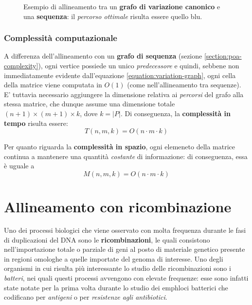 \begin{figure}[ht]
        \caption{Esempio di allineamento tra un \textbf{grafo di variazione canonico} e una \textbf{sequenza}: il \emph{percorso ottimale} risulta essere quello blu.}
    \end{figure}
\subsubsection{Complessità computazionale}
\label{section:variation-complexity}
   A differenza dell'allineamento con un \textbf{grafo di sequenza} (sezione \ref{section:poa-complexity}), ogni vertice possiede un unico \emph{predecessore} e quindi, sebbene non immediatamente evidente dall'equazione \ref{equation:variation-graph}, ogni cella della matrice viene computata in $O(1)$ (come nell'allineamento tra sequenze). E' tuttavia necessario aggiungere la dimensione relativa ai \emph{percorsi} del grafo alla stessa matrice, che dunque assume una dimensione totale $(n+1) \times (m+1) \times k$, dove $k = \lvert P \rvert$. Di conseguenza, la \textbf{complessità in tempo} risulta essere:
    \begin{equation*}
        T(n, m, k) = O(n \cdot m \cdot k)
        \label{equation:variation_time_complexity}
    \end{equation*}
    
    Per quanto riguarda la \textbf{complessità in spazio}, ogni elemeneto della matrice continua a mantenere una quantità \emph{costante} di informazione: di conseguenza, essa è uguale a
    \begin{equation*}
        M(n, m, k) = O(n \cdot m \cdot k)
    \end{equation*}

\section{Allineamento con ricombinazione}
    Uno dei processi biologici che viene osservato con molta frequenza durante le fasi di duplicazioni del DNA sono le \textbf{ricombinazioni}, le quali consistono nell'importazione totale o parziale di geni al posto di materiale genetico presente in regioni omologhe a quelle importate del genoma di interesse. Uno degli organismi in cui risulta più interessante lo studio delle ricombinazioni sono i \emph{batteri}, nei quali questi processi avvengono con elevate frequenze: esse sono infatti state notate per la prima volta durante lo studio dei emph{loci batterici} che codificano per \emph{antigeni} o per \emph{resistenze agli antibiotici}.
    
